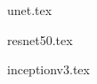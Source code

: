 \documentclass[
	article, %
	10pt, %
]{CSUniSchoolLabReport}
\begin{document}
\appendix
{unet.tex}

{resnet50.tex}

{inceptionv3.tex}


\printbibliography %


\pagebreak


\end{document}
